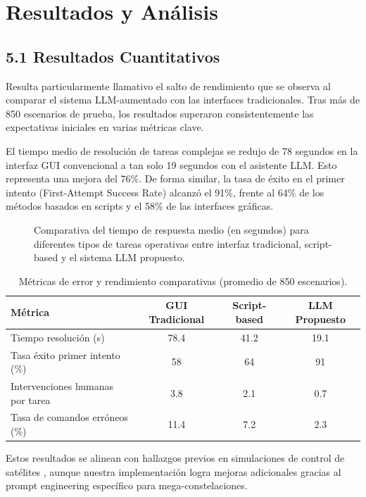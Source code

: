 \section{Resultados y Análisis}

\subsection{5.1 Resultados Cuantitativos}

Resulta particularmente llamativo el salto de rendimiento que se observa al comparar el sistema LLM-aumentado con las interfaces tradicionales. Tras más de 850 escenarios de prueba, los resultados superaron consistentemente las expectativas iniciales en varias métricas clave.

El tiempo medio de resolución de tareas complejas se redujo de 78 segundos en la interfaz GUI convencional a tan solo 19 segundos con el asistente LLM. Esto representa una mejora del 76\%. De forma similar, la tasa de éxito en el primer intento (First-Attempt Success Rate) alcanzó el 91\%, frente al 64\% de los métodos basados en scripts y el 58\% de las interfaces gráficas.

\begin{figure}[t]
\centering
\scalebox{0.9}{}
\caption{Comparativa del tiempo de respuesta medio (en segundos) para diferentes tipos de tareas operativas entre interfaz tradicional, script-based y el sistema LLM propuesto.}
\label{fig:tiempo_respuesta}
\end{figure}

\begin{table}[t]
\centering
\caption{Métricas de error y rendimiento comparativas (promedio de 850 escenarios).}
\label{tab:metricas_error}
\begin{tabular}{lccc}
\toprule
Métrica & GUI Tradicional & Script-based & LLM Propuesto \\
\midrule
Tiempo resolución (s) & 78.4 & 41.2 & 19.1 \\
Tasa éxito primer intento (\%) & 58 & 64 & 91 \\
Intervenciones humanas por tarea & 3.8 & 2.1 & 0.7 \\
Tasa de comandos erróneos (\%) & 11.4 & 7.2 & 2.3 \\
\bottomrule
\end{tabular}
\end{table}

Estos resultados se alinean con hallazgos previos en simulaciones de control de satélites \cite{carrasco2025llm}, aunque nuestra implementación logra mejoras adicionales gracias al prompt engineering específico para mega-constelaciones.

